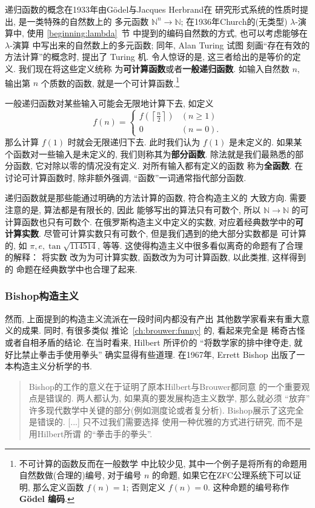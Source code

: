 递归函数的概念在1933年由G\"odel与Jacques Herbrand在
研究形式系统的性质时提出, 是一类特殊的自然数上的
多元函数 \(\mathbb N^n \to \mathbb N\);
在1936年Church的(无类型) \(\lambda\)-演算中, 使用 \ref{beginning:lambda}~节
中提到的编码自然数的方式, 也可以考虑能够在 \(\lambda\)-演算
中写出来的自然数上的多元函数; 同年, Alan Turing 试图
刻画“存在有效的方法计算”的概念时, 提出了 Turing 机. 令人惊讶的是,
这三者给出的是等价的定义. 我们现在将这些定义统称
为\textbf{可计算函数}或者\textbf{一般递归函数}.
如输入自然数 \(n\), 输出第 \(n\) 个质数的函数,
就是一个可计算函数.\footnote{不可计算的函数反而在一般数学
中比较少见, 其中一个例子是将所有的命题用自然数做(合理的)编号,
对于编号 \(n\) 的命题, 如果它在ZFC公理系统下可以证明,
那么定义函数 \(f(n) = 1\); 否则定义 \(f(n) = 0\).
这种命题的编号称作 \textbf{G\"odel 编码}.}

一般递归函数对某些输入可能会无限地计算下去, 如定义
\[f(n) = \begin{cases}
f\left(\left\lceil \frac n2 \right\rceil\right) & (n \ge 1)\\
0 & (n = 0).
\end{cases}\]
那么计算 \(f(1)\) 时就会无限递归下去. 此时我们认为
\(f(1)\) 是未定义的. 如果某个函数对一些输入是未定义的,
我们则称其为\textbf{部分函数}. 除法就是我们最熟悉的部分函数,
它对除以零的情况没有定义. 对所有输入都有定义的函数
称为\textbf{全函数}. 在讨论可计算函数时, 除非额外强调,
“函数”一词通常指代部分函数.

递归函数就是那些能通过明确的方法计算的函数, 符合构造主义的
大致方向. 需要注意的是, 算法都是有限长的, 因此
能够写出的算法只有可数个, 所以 \(\mathbb N \to \mathbb N\)
的可计算函数也只有可数个.
在俄罗斯构造主义中定义的实数, 对应着经典数学中的\textbf{可计算实数}.
尽管可计算实数只有可数个, 但是我们遇到的绝大部分实数都是
可计算的, 如 \(\pi, e, \tan\sqrt{114514}\), 等等.
这使得构造主义中很多看似离奇的命题有了合理的解释： 将实数
改为为可计算实数, 函数改为为可计算函数, 以此类推, 这样得到的
命题在经典数学中也合理了起来.

\subsubsection{Bishop构造主义}\label{ch:bishop}

然而, 上面提到的构造主义流派在一段时间内都没有产出
其他数学家看来有重大意义的成果. 同时, 有很多类似
推论~\ref{ch:brouwer:funny} 的, 看起来完全是
稀奇古怪或者自相矛盾的结论.
在当时看来, Hilbert 所评价的 “将数学家的排中律夺走,
就好比禁止拳击手使用拳头” 确实显得有些道理.
在1967年, Errett Bishop 出版了一本构造主义分析学的书.
\begin{quotation}
Bishop的工作的意义在于证明了原本Hilbert与Brouwer都同意
的一个重要观点是错误的. 两人都认为, 如果真的要发展构造主义数学,
那么就必须 “放弃” 许多现代数学中关键的部分(例如测度论或者复分析).
Bishop展示了这完全是错误的. [...] 只不过我们需要选择
使用一种优雅的方式进行研究, 而不是用Hilbert所谓
的“拳击手的拳头”.~\cite{beeson:1985:constructive}
\end{quotation}

